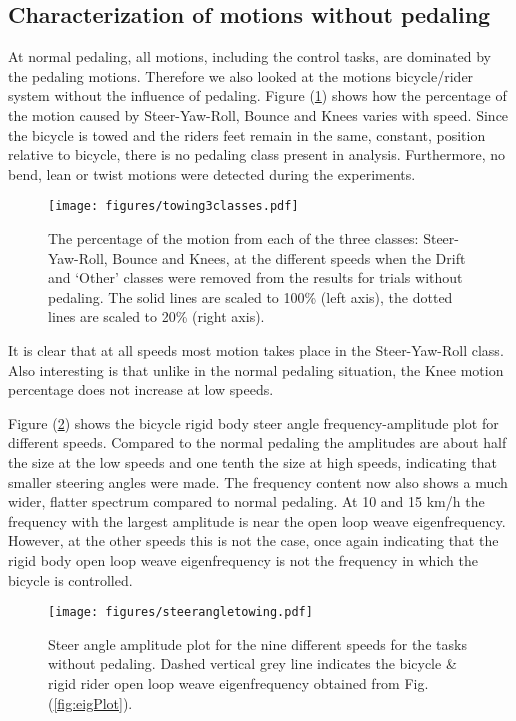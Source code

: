 \subsection{Characterization of motions without pedaling}
\label{sec:noPed}
At normal pedaling, all motions, including the control tasks, are dominated by
the pedaling motions. Therefore we also looked at the motions bicycle/rider
system without the influence of pedaling. Figure (\ref{missjellybean}) shows
how the percentage of the motion caused by Steer-Yaw-Roll, Bounce and Knees
varies with speed. Since the bicycle is towed and the riders feet remain in the
same, constant, position relative to bicycle, there is no pedaling class
present in analysis. Furthermore, no bend, lean or twist motions were detected
during the experiments.
\begin{figure}[tb]
    \centering
        \texttt{[image: figures/towing3classes.pdf]}\\
    \caption{The percentage of the motion from each of the three classes:
    Steer-Yaw-Roll, Bounce and Knees, at the different speeds when the Drift
    and `Other' classes were removed from the results for trials without
    pedaling. The solid lines are scaled to 100\% (left axis), the dotted lines
    are scaled to 20\% (right axis).}
    \label{missjellybean}
\end{figure}

It is clear that at all speeds most motion takes place in the Steer-Yaw-Roll
class. Also interesting is that unlike in the normal pedaling situation, the
Knee motion percentage does not increase at low speeds.

Figure (\ref{towingsteerangle}) shows the bicycle rigid body steer angle
frequency-amplitude plot for different speeds. Compared to the normal pedaling
the amplitudes are about half the size at the low speeds and one tenth the size
at high speeds, indicating that smaller steering angles were made. The
frequency content now also shows a much wider, flatter spectrum compared to
normal pedaling. At 10 and 15 km/h the frequency with the largest amplitude is
near the open loop weave eigenfrequency. However, at the other speeds this is
not the case, once again indicating that the rigid body open loop weave
eigenfrequency is not the frequency in which the bicycle is controlled.
\begin{figure}[]
    \centering
        \texttt{[image: figures/steerangletowing.pdf]}\\
    \caption{Steer angle amplitude plot for the nine different speeds for the
    tasks without pedaling. Dashed vertical grey line indicates the bicycle \&
    rigid rider open loop weave eigenfrequency obtained from Fig.
    (\ref{fig:eigPlot}).}
    \label{towingsteerangle}
\end{figure}

